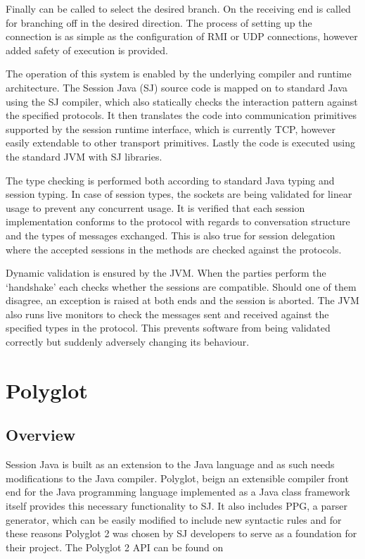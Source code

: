 Finally  can be called to select the desired branch. On the receiving end 
 is called for branching off in the desired direction. The process of setting up the connection is as simple as the configuration of RMI or UDP connections, however added safety of execution is provided.

The operation of this system is enabled by the underlying compiler and runtime architecture. The Session Java (SJ) source code is mapped on to standard Java using the SJ compiler, which also statically checks the interaction pattern against the specified protocols. It then translates the code into communication primitives supported by the session runtime interface, which is currently TCP, however easily extendable to other transport primitives. Lastly the code is executed using the standard JVM with SJ libraries.

The type checking is performed both according to standard Java typing and session typing. In case of session types, the sockets are being validated for linear usage to prevent any concurrent usage. It is verified that each session implementation conforms to the protocol with regards to conversation structure and the types of messages exchanged. This is also true for session delegation where the accepted sessions in the methods are checked against the protocols.

Dynamic validation is ensured by the JVM. When the parties perform the `handshake' each checks whether the sessions are compatible. Should one of them disagree, an exception is raised at both ends and the session is aborted. The JVM also runs live monitors to check the messages sent and received against the specified types in the protocol. This prevents software from being validated correctly but suddenly adversely changing its behaviour.


\section{Polyglot}
\label{sec:polyglot}

\subsection{Overview}
\label{subsec:polyglotoverview}
Session Java is built as an extension to the Java language and as such needs modifications to the Java compiler. Polyglot, beign an extensible compiler front end for the Java programming language implemented as a Java class framework \cite{polyglotonline} itself provides this necessary functionality to SJ. It also includes PPG, a parser generator, which can be easily modified to include new syntactic rules and for these reasons Polyglot 2 was chosen by SJ developers to serve as a foundation for their project. The Polyglot 2 API can be found on \cite{polyglotapi}


